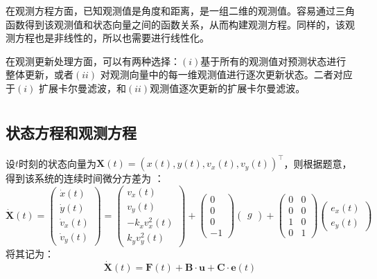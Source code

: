 \documentclass[12pt, onecolumn]{article}
\newcommand\normf{\fangsong}
\begin{document}
	在观测方程方面，已知观测值是角度和距离，是一组二维的观测值。容易通过三角函数得到该观测值和状态向量之间的函数关系，从而构建观测方程。同样的，该观测方程也是非线性的，所以也需要进行线性化。
	
	在观测更新处理方面，可以有两种选择：$(i)$基于所有的观测值对预测状态进行整体更新，或者$(ii)$ 对观测向量中的每一维观测值进行逐次更新状态。二者对应于$(i)$ 扩展卡尔曼滤波，和$(ii)$观测值逐次更新的扩展卡尔曼滤波。
	
	\section{\normf{分析和解题}}
	
	\subsection{\normf 状态方程和观测方程}
	设$t$时刻的状态向量为$\boldsymbol{X}(t)=\left( x(t),y(t),v_x(t),v_y(t)\right) ^\top$，则根据题意，得到该系统的连续时间微分方差为
	：
	\begin{equation}
	\dot{\boldsymbol{X}}(t)=\begin{pmatrix}
	\dot{x}(t)\\\dot{y}(t)\\\dot{v}_x(t)\\\dot{v}_y(t)
	\end{pmatrix}=\begin{pmatrix}
	v_x(t)\\
	v_y(t)\\
	-k_x v^2_x(t)\\
	k_y v^2_y(t)
	\end{pmatrix}+\begin{pmatrix}
	0\\0\\0\\-1
	\end{pmatrix}\begin{pmatrix}
	g
	\end{pmatrix}+\begin{pmatrix}
	0&0\\
	0&0\\
	1&0\\
	0&1
	\end{pmatrix}\begin{pmatrix}
	e_x(t)\\
	e_y(t)
	\end{pmatrix}
	\end{equation}
	将其记为：
	\begin{equation}
	\dot{\boldsymbol{X}}(t)=\boldsymbol{F}(t)+\boldsymbol{B}\cdot\boldsymbol{u}+\boldsymbol{C}\cdot\boldsymbol{e}(t)
	\end{equation}
\end{document}
